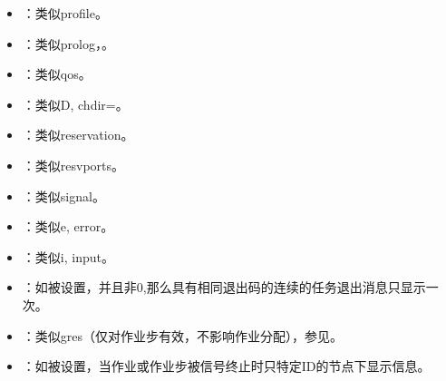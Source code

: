 \documentclass[a4paper,12pt,english]{sphinxmanual}
\begin{document}
\begin{itemize}
\item {} 
\sphinxAtStartPar
{}：类似\sphinxhyphen{}\sphinxhyphen{}profile。

\item {} 
\sphinxAtStartPar
{}：类似\sphinxhyphen{}\sphinxhyphen{}prolog，。

\item {} 
\sphinxAtStartPar
{}：类似\sphinxhyphen{}\sphinxhyphen{}qos。

\item {} 
\sphinxAtStartPar
{}：类似\sphinxhyphen{}D, \sphinxhyphen{}\sphinxhyphen{}chdir=。

\item {} 
\sphinxAtStartPar
{}：类似\sphinxhyphen{}\sphinxhyphen{}reservation。

\item {} 
\sphinxAtStartPar
{}：类似\sphinxhyphen{}\sphinxhyphen{}resv\sphinxhyphen{}ports。

\item {} 
\sphinxAtStartPar
{}：类似\sphinxhyphen{}\sphinxhyphen{}signal。

\item {} 
\sphinxAtStartPar
{}：类似\sphinxhyphen{}e, \sphinxhyphen{}\sphinxhyphen{}error。

\item {} 
\sphinxAtStartPar
{}：类似\sphinxhyphen{}i, \sphinxhyphen{}\sphinxhyphen{}input。

\item {} 
\sphinxAtStartPar
{}：如被设置，并且非0,那么具有相同退出码的连续的任务退出消息只显示一次。

\item {} 
\sphinxAtStartPar
{}：类似\sphinxhyphen{}\sphinxhyphen{}gres（仅对作业步有效，不影响作业分配），参见。

\item {} 
\sphinxAtStartPar
{}：如被设置，当作业或作业步被信号终止时只特定ID的节点下显示信息。


\end{itemize}
\end{document}
